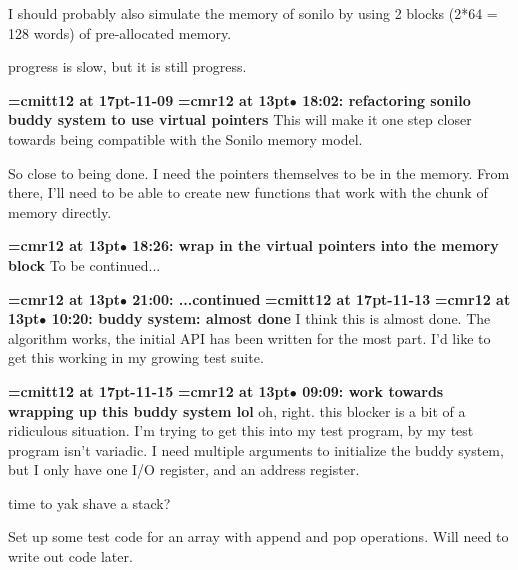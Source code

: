 I should probably also simulate the memory of sonilo by using 2 blocks (2*64 = 128 words) of pre-allocated memory.
\par

progress is slow, but it is still progress.
\par

{\medskip\noindent\bf\font\titlefont=cmitt12 at 17pt-11-09}\medskip
{\smallskip\noindent\bf\font\titlefont=cmr12 at 13pt\titlefont $\bullet$ 18:02: refactoring sonilo buddy system to use virtual pointers}\smallskip
This will make it one step closer towards being compatible with the Sonilo memory model.
\par

So close to being done. I need the pointers themselves to be in the memory. From there, I'll need to be able to create new functions that work with the chunk of memory directly.
\par

{\smallskip\noindent\bf\font\titlefont=cmr12 at 13pt\titlefont $\bullet$ 18:26: wrap in the virtual pointers into the memory block}\smallskip
To be continued...
\par

{\smallskip\noindent\bf\font\titlefont=cmr12 at 13pt\titlefont $\bullet$ 21:00: ...continued}\smallskip
{\medskip\noindent\bf\font\titlefont=cmitt12 at 17pt-11-13}\medskip
{\smallskip\noindent\bf\font\titlefont=cmr12 at 13pt\titlefont $\bullet$ 10:20: buddy system: almost done}\smallskip
I think this is almost done. The algorithm works, the initial API has been written for the most part. I'd like to get this working in my growing test suite.
\par

{\medskip\noindent\bf\font\titlefont=cmitt12 at 17pt-11-15}\medskip
{\smallskip\noindent\bf\font\titlefont=cmr12 at 13pt\titlefont $\bullet$ 09:09: work towards wrapping up this buddy system lol}\smallskip
oh, right. this blocker is a bit of a ridiculous situation. I'm trying to get this into my test program, by my test program isn't variadic. I need multiple arguments to initialize the buddy system, but I only have one I/O register, and an address register.
\par

time to yak shave a stack?
\par

Set up some test code for an array with append and pop operations. Will need to write out code later.
\par

